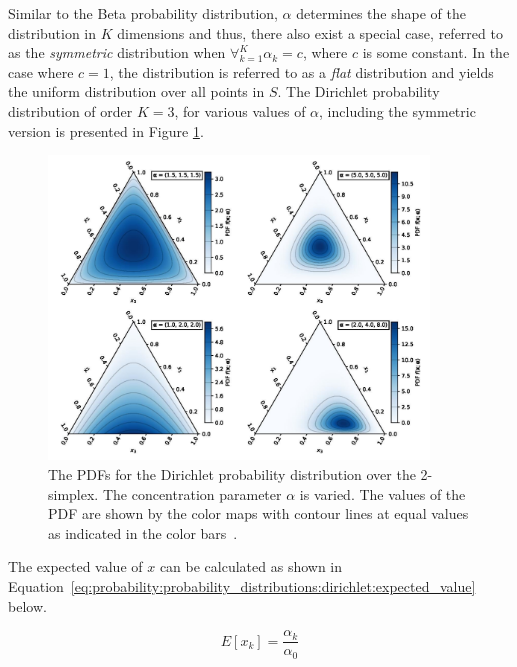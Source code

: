 Similar to the Beta probability distribution, $\alpha$ determines the shape of the distribution in $K$ dimensions and thus, there also exist a special case, referred to as the \textit{symmetric} distribution when $\forall_{k=1}^{K} \alpha_{k} = c$, where $c$ is some constant. In the case where $c = 1$, the distribution is referred to as a \textit{flat} distribution and yields the uniform distribution over all points in $S$. The Dirichlet probability distribution of order $K = 3$, for various values of $\alpha$, including the symmetric version is presented in Figure \ref{fig:probability:probability_distributions:dirichlet}.

\begin{figure}[htb]
      \centering
      \includegraphics[width=0.9\textwidth]{images/dirichlet.pdf}
      \caption{The \acfp{PDF} for the Dirichlet probability distribution over the 2-simplex. The concentration parameter $\alpha$ is varied. The values of the \acs{PDF} are shown by the color maps with contour lines at equal values as indicated in the color bars~\cite{ref:dirichlet:2020}.}
      \label{fig:probability:probability_distributions:dirichlet}
\end{figure}

\noindent
The expected value of $x$ can be calculated as shown in Equation~\eqref{eq:probability:probability_distributions:dirichlet:expected_value} below.

\begin{equation}
      \label{eq:probability:probability_distributions:dirichlet:expected_value}
      E[x_{k}] = \frac{\alpha_{k}}{\alpha_{0}}
\end{equation}

